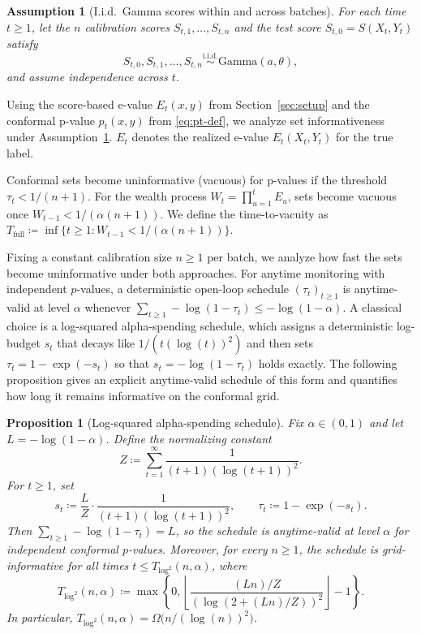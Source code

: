 \documentclass{uai2026} %
\newtheorem{proposition}[theorem]{Proposition}
\newtheorem{assumption}[theorem]{Assumption}
\newcommand{\1}{\mathbf{1}}
\begin{document}
\begin{assumption}[I.i.d.\ Gamma scores within and across batches]
  \label{ass:gamma-scores}
  For each time $t\ge 1$, let the $n$ calibration scores $S_{t,1}, \dots, S_{t,n}$ and the test score $S_{t,0} = S(X_{t}, Y_{t})$ satisfy
  \begin{equation*}
    S_{t,0}, S_{t,1}, \ldots, S_{t,n} \stackrel{\text{i.i.d.}}{\sim} \mathrm{Gamma}(a, \theta),
  \end{equation*}
  and assume independence across $t$.
\end{assumption}

Using the score-based e-value $E_t(x, y)$ from Section~\ref{sec:setup} and the conformal p-value $p_t(x, y)$ from \eqref{eq:pt-def}, we analyze set informativeness under Assumption~\ref{ass:gamma-scores}. $E_t$ denotes the realized e-value $E_t(X_t, Y_t)$ for the true label.

Conformal sets become uninformative (vacuous) for p-values if the threshold $\tau_t < 1/(n+1)$. For the wealth process $W_t = \prod_{u=1}^t E_u$, sets become vacuous once $W_{t-1} < 1/(\alpha(n+1))$. We define the time-to-vacuity as $T_{\mathrm{full}} \coloneqq \inf\{t \ge 1 \colon W_{t-1} < 1/(\alpha(n+1))\}$.

Fixing a constant calibration size $n \ge 1$ per batch, we analyze how fast the sets become uninformative under both approaches.
For anytime monitoring with independent $p$-values, a deterministic open-loop schedule $(\tau_{t})_{t\ge 1}$ is anytime-valid at level $\alpha$ whenever $\sum_{t\ge 1} -\log(1-\tau_{t}) \le -\log(1-\alpha)$.
A classical choice is a log-squared alpha-spending schedule, which assigns a deterministic log-budget $s_t$ that decays like $1/(t(\log(t))^2)$ and then sets $\tau_t=1-\exp(-s_t)$ so that $s_t=-\log(1-\tau_t)$ holds exactly.
The following proposition gives an explicit anytime-valid schedule of this form and quantifies how long it remains informative on the conformal grid.

\begin{proposition}[Log-squared alpha-spending schedule]
  \label{prop:log2-spending}
  Fix $\alpha\in(0,1)$ and let $L=-\log(1-\alpha)$.
  Define the normalizing constant
  \begin{equation}
    \label{eq:Z-log2}
    Z \coloneqq \sum_{t=1}^{\infty} \frac{1}{(t+1)(\log(t+1))^2}.
  \end{equation}
  For $t\ge 1$, set
  \begin{equation*}
    s_t \coloneqq \frac{L}{Z}\cdot \frac{1}{(t+1)(\log(t+1))^2},
    \qquad
    \tau_t \coloneqq 1-\exp(-s_t).
  \end{equation*}
  Then $\sum_{t\ge 1}-\log(1-\tau_t)=L$, so the schedule is anytime-valid at level $\alpha$ for independent conformal $p$-values.
  Moreover, for every $n\ge 1$, the schedule is grid-informative for all times $t\le T_{\log^2}(n,\alpha)$, where
  \begin{equation}
    \label{eq:Tlog2}
    T_{\log^2}(n,\alpha)
    \coloneqq
    \max\left\{0, \left\lfloor \frac{(L n)/Z}{(\log(2+(L n)/Z))^2}\right\rfloor - 1\right\}.
  \end{equation}
  In particular, $T_{\log^2}(n,\alpha)=\Omega\bigl(n/(\log(n))^2\bigr)$.
\end{proposition}
\end{document}
